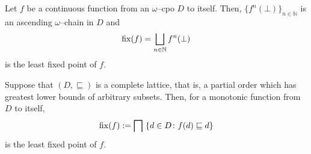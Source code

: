 \begin{thm}\label{thm:cpo-fixed}
  Let \(f\) be a continuous function from an \(\omega\)--cpo \(D\) to itself.
  Then, \(\lbrace f^n(\bot) \rbrace_{n \in \mathbb{N}}\) is an ascending \(\omega\)--chain in \(D\) and
  \begin{equation}
    \operatorname{fix}(f) = \bigsqcup_{n \in \mathbb{N}} f^n(\bot)
  \end{equation}
  is the least fixed point of \(f\).  
\end{thm}

\begin{thm}\label{thm:knaster-tarski}
  Suppose that \((D, {}\sqsubseteq)\) is a complete lattice, that is, a partial order which has greatest lower bounds of arbitrary subsets.
  Then, for a monotonic function from \(D\) to itself,
  \begin{equation}
    \fix(f) := \bigsqcap\,\,\lbrace d \in D \colon f(d) \sqsubseteq d \rbrace
  \end{equation}
  is the least fixed point of \(f\).
\end{thm}
